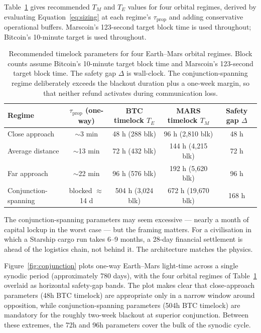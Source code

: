 \documentclass[11pt]{article}
\begin{document}
Table~\ref{tab:timeouts} gives recommended $T_M$ and $T_E$ values for four orbital regimes, derived by evaluating Equation~\ref{eq:sizing} at each regime's $\tau_{\text{prop}}$ and adding conservative operational buffers. Marscoin's 123-second target block time is used throughout; Bitcoin's 10-minute target is used throughout.

\begin{table}[ht]
\centering
\footnotesize
\begin{tabular}{@{}lcccc@{}}
\toprule
Regime & $\tau_{\text{prop}}$ (one-way) & BTC timelock $T_E$ & MARS timelock $T_M$ & Safety gap $\Delta$ \\
\midrule
Close approach        & $\sim$3 min    & 48 h  (288 blk)   & 96 h  (2{,}810 blk)  & 48 h \\
Average distance      & $\sim$13 min   & 72 h  (432 blk)   & 144 h (4{,}215 blk)  & 72 h \\
Far approach          & $\sim$22 min   & 96 h  (576 blk)   & 192 h (5{,}620 blk)  & 96 h \\
Conjunction-spanning  & blocked $\approx$14 d & 504 h (3{,}024 blk) & 672 h (19{,}670 blk) & 168 h \\
\bottomrule
\end{tabular}
\caption{Recommended timelock parameters for four Earth--Mars orbital regimes. Block counts assume Bitcoin's 10-minute target block time and Marscoin's 123-second target block time. The safety gap $\Delta$ is wall-clock. The conjunction-spanning regime deliberately exceeds the blackout duration plus a one-week margin, so that neither refund activates during communication loss.}
\label{tab:timeouts}
\end{table}

The conjunction-spanning parameters may seem excessive --- nearly a month of capital lockup in the worst case --- but the framing matters. For a civilisation in which a Starship cargo run takes 6--9 months, a 28-day financial settlement is ahead of the logistics chain, not behind it. The architecture matches the physics.

Figure~\ref{fig:conjunction} plots one-way Earth--Mars light-time across a single synodic period (approximately 780 days), with the four orbital regimes of Table~\ref{tab:timeouts} overlaid as horizontal safety-gap bands. The plot makes clear that close-approach parameters (48h BTC timelock) are appropriate only in a narrow window around opposition, while conjunction-spanning parameters (504h BTC timelock) are mandatory for the roughly two-week blackout at superior conjunction. Between these extremes, the 72h and 96h parameters cover the bulk of the synodic cycle.
\end{document}
